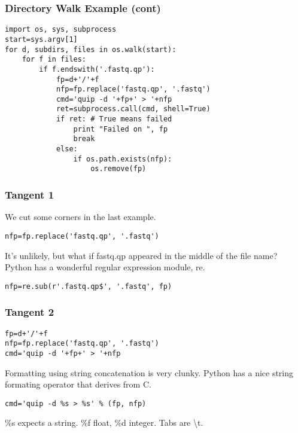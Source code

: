 \documentclass[10pt]{beamer}
\begin{document}
\begin{frame}[fragile]
\frametitle{Directory Walk Example (cont)}

\begin{verbatim}
import os, sys, subprocess
start=sys.argv[1]
for d, subdirs, files in os.walk(start):
    for f in files:
        if f.endswith('.fastq.qp'):
            fp=d+'/'+f
            nfp=fp.replace('fastq.qp', '.fastq')
            cmd='quip -d '+fp+' > '+nfp
            ret=subprocess.call(cmd, shell=True)
            if ret: # True means failed
                print "Failed on ", fp
                break
            else:
                if os.path.exists(nfp):
                    os.remove(fp)
\end{verbatim}
\end{frame}

\begin{frame}[fragile]
\frametitle{Tangent 1}

We cut some corners in the last example. 
\vspace{5mm}

\verb+nfp=fp.replace('fastq.qp', '.fastq')+

\vspace{5mm}
It's unlikely, but what if fastq.qp appeared in the middle of the file name?\\
Python has a wonderful regular expression module, re.

\vspace{5mm}
\verb+nfp=re.sub(r'.fastq.qp$', '.fastq', fp)+

\end{frame}

\begin{frame}[fragile]
\frametitle{Tangent 2}

\begin{verbatim}
fp=d+'/'+f
nfp=fp.replace('fastq.qp', '.fastq')
cmd='quip -d '+fp+' > '+nfp
\end{verbatim}

Formatting using string concatenation is very clunky.  Python has a 
nice string formating operator that derives from C.

\begin{verbatim}
cmd='quip -d %s > %s' % (fp, nfp)
\end{verbatim}

\%s expects a string. \%f float, \%d integer.  Tabs are \textbackslash t.

\end{frame}
\end{document}
